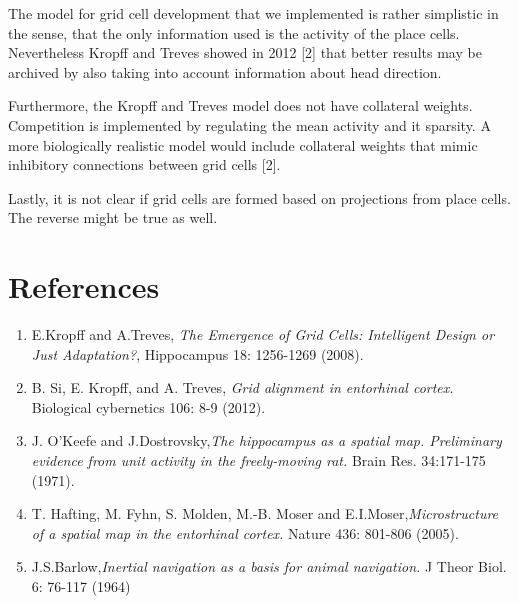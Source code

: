 \documentclass[a4paper, 12pt]{article}
\begin{document}

The model for grid cell development that we implemented is rather simplistic in the sense, that the only information used is the activity of the place cells. Nevertheless Kropff and Treves showed in 2012 [2] that better results may be archived by also taking into account information about head direction. 

Furthermore, the Kropff and Treves model does not have collateral weights. Competition is implemented by regulating the mean activity and it sparsity. A more biologically realistic model would include collateral weights that mimic inhibitory connections between grid cells [2]. 

Lastly, it is not clear if grid cells are formed based on projections from place cells. The reverse might be true as well.

\newpage
\section{References}
\begin{enumerate}
\item E.Kropff and A.Treves, \textit{The Emergence of Grid Cells: Intelligent Design or Just Adaptation?}, Hippocampus 18: 1256-1269 (2008).

\item B. Si, E. Kropff, and A. Treves, \textit{Grid alignment in entorhinal cortex.} Biological cybernetics 106: 8-9 (2012).

\item J. O'Keefe and J.Dostrovsky,\textit{The hippocampus as a spatial map. Preliminary evidence from unit activity in the freely-moving rat.} Brain Res. 34:171-175 (1971). 

\item T. Hafting, M. Fyhn, S. Molden, M.-B. Moser and E.I.Moser,\textit{Microstructure of a spatial map in the entorhinal cortex.} Nature 436: 801-806 (2005).

\item J.S.Barlow,\textit{Inertial navigation as a basis for animal navigation.} J Theor Biol. 6:  76-117 (1964)
\end{enumerate}
\end{document}
